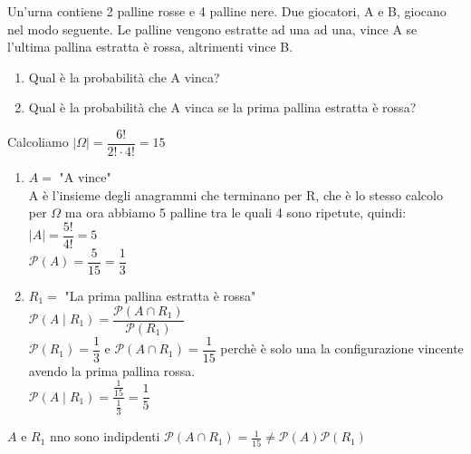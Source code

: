 \documentclass[12pt]{report}
\newcounter{exercise}
\begin{document}
	\begin{exercise}{}{}
		\begin{assignment}{}{}
			Un'urna contiene 2 palline rosse e 4 palline nere. Due giocatori, A e B, giocano nel modo seguente. Le palline vengono estratte ad una ad una, vince A se l'ultima pallina estratta è rossa, altrimenti vince B.
			\begin{enumerate}
				\item Qual è la probabilità che A vinca?
				\item Qual è la probabilità che A vinca se la prima pallina estratta è rossa?
			\end{enumerate}
		\end{assignment}
		Calcoliamo $|\Omega| = \dfrac{6!}{2! \cdot 4!} = 15$
		\begin{enumerate}
			\item $A = $ "A vince" \\
			A è l'insieme degli anagrammi che terminano per R, che è lo stesso calcolo per $\Omega$ ma ora abbiamo 5 palline tra le quali 4 sono ripetute, quindi: \\
			$|A| = \dfrac{5!}{4!} = 5$ \\
			$\mathcal{P}(A) = \dfrac{5}{15} = \dfrac{1}{3}$
			\item $R_1 =$ "La prima pallina estratta è rossa" \\
			$\mathcal{P}(A \mid R_1) = \dfrac{\mathcal{P}(A \cap R_1)}{\mathcal{P}(R_1)}$ \\
			$\mathcal{P}(R_1) = \dfrac{1}{3}$ e $\mathcal{P}(A \cap R_1) = \dfrac{1}{15}$ perchè è solo una la configurazione vincente avendo la prima pallina rossa. \\
			$\mathcal{P}(A \mid R_1) = \dfrac{\frac{1}{15}}{\frac{1}{3}} = \dfrac{1}{5}$
		\end{enumerate}
		$A$ e $R_1$ nno sono indipdenti $\mathcal{P}(A \cap R_1) = \frac{1}{15} \neq \mathcal{P}(A)\mathcal{P}(R_1)$
	\end{exercise}
\end{document}
